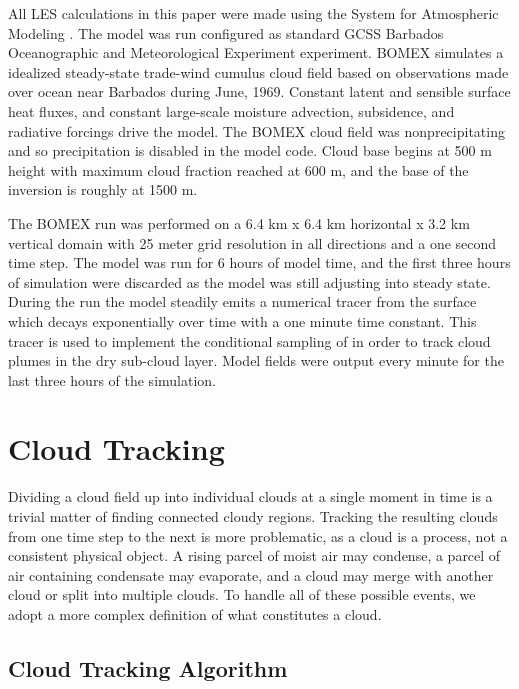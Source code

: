 \documentclass[acp]{copernicus}
\begin{document}
All LES calculations in this paper were made using the System for Atmospheric 
Modeling \citep[SAM;][]{Khairoutdinov2003}.  The model was run configured as 
standard GCSS Barbados Oceanographic and Meteorological Experiment 
\citep[BOMEX;][]{Holland1973, Siebesma2003} experiment.  BOMEX simulates a 
idealized steady-state trade-wind cumulus cloud field based on observations 
made over ocean near Barbados during June, 1969.  Constant latent and sensible 
surface heat fluxes, and constant large-scale moisture advection, subsidence, 
and radiative forcings drive the model.  The BOMEX cloud field was 
nonprecipitating and so precipitation is disabled in the model code.  Cloud 
base begins at 500 m height with maximum cloud fraction reached at 600 m, and 
the base of the inversion is roughly at 1500 m.

The BOMEX run was performed on a 6.4 km x 6.4 km horizontal x 3.2 km vertical 
domain with 25 meter grid resolution in all directions and a one second time 
step.  The model was run for 6 hours of model time, and the first three hours 
of simulation were discarded as the model was still adjusting into steady 
state. During the run the model steadily emits a numerical tracer from the 
surface which decays exponentially over time with a one minute time constant.  
This tracer is used to implement the conditional sampling of 
\cite{Couvreaux2010} in order to track cloud plumes in the dry sub-cloud 
layer.  Model fields were output every minute for the last three hours of the 
simulation.


\section{Cloud Tracking}

Dividing a cloud field up into individual clouds at a single moment in time is 
a trivial matter of finding connected cloudy regions.  Tracking the resulting 
clouds from one time step to the next is more problematic, as a cloud is a 
process, not a consistent physical object.  A rising parcel of moist air may 
condense, a parcel of air containing condensate may evaporate, and a cloud 
may merge with another cloud or split into multiple clouds.  To handle all of 
these possible events, we adopt a more complex definition of what constitutes 
a cloud.

\subsection{Cloud Tracking Algorithm}
\end{document}
